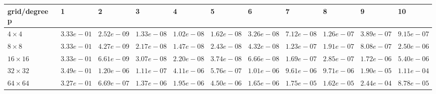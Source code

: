 \begin{tabular}{lllllllllll}
\hline
 grid/degree p   & 1          & 2          & 3          & 4          & 5          & 6          & 7          & 8          & 9          & 10         \\
\hline
 $4 \times 4$    & $3.33e-01$ & $2.52e-09$ & $1.33e-08$ & $1.02e-08$ & $1.62e-08$ & $3.26e-08$ & $7.12e-08$ & $1.26e-07$ & $3.89e-07$ & $9.15e-07$ \\
 $8 \times 8$    & $3.33e-01$ & $4.27e-09$ & $2.17e-08$ & $1.47e-08$ & $2.43e-08$ & $4.32e-08$ & $1.23e-07$ & $1.91e-07$ & $8.08e-07$ & $2.50e-06$ \\
 $16 \times 16$  & $3.33e-01$ & $6.61e-09$ & $3.07e-08$ & $2.20e-08$ & $3.74e-08$ & $6.66e-08$ & $1.69e-07$ & $2.85e-07$ & $1.72e-06$ & $5.40e-06$ \\
 $32 \times 32$  & $3.49e-01$ & $1.20e-06$ & $1.11e-07$ & $4.11e-06$ & $5.76e-07$ & $1.01e-06$ & $9.61e-06$ & $9.71e-06$ & $1.90e-05$ & $1.11e-04$ \\
 $64 \times 64$  & $3.27e-01$ & $6.69e-07$ & $1.37e-06$ & $1.95e-06$ & $4.50e-06$ & $1.65e-06$ & $1.75e-05$ & $1.62e-05$ & $2.44e-04$ & $8.78e-05$ \\
\hline
\end{tabular}